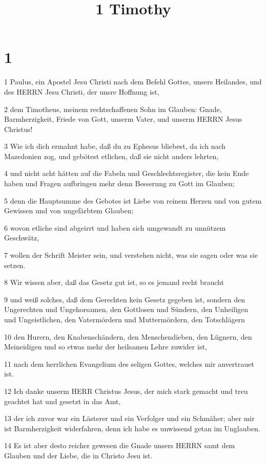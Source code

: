 

\title{1 Timothy}


\chapter{1}

\par 1 Paulus, ein Apostel Jesu Christi nach dem Befehl Gottes, unsers Heilandes, und des HERRN Jesu Christi, der unsre Hoffnung ist,
\par 2 dem Timotheus, meinem rechtschaffenen Sohn im Glauben: Gnade, Barmherzigkeit, Friede von Gott, unserm Vater, und unserm HERRN Jesus Christus!
\par 3 Wie ich dich ermahnt habe, daß du zu Ephesus bliebest, da ich nach Mazedonien zog, und gebötest etlichen, daß sie nicht anders lehrten,
\par 4 und nicht acht hätten auf die Fabeln und Geschlechtsregister, die kein Ende haben und Fragen aufbringen mehr denn Besserung zu Gott im Glauben;
\par 5 denn die Hauptsumme des Gebotes ist Liebe von reinem Herzen und von gutem Gewissen und von ungefärbtem Glauben;
\par 6 wovon etliche sind abgeirrt und haben sich umgewandt zu unnützem Geschwätz,
\par 7 wollen der Schrift Meister sein, und verstehen nicht, was sie sagen oder was sie setzen.
\par 8 Wir wissen aber, daß das Gesetz gut ist, so es jemand recht braucht
\par 9 und weiß solches, daß dem Gerechten kein Gesetz gegeben ist, sondern den Ungerechten und Ungehorsamen, den Gottlosen und Sündern, den Unheiligen und Ungeistlichen, den Vatermördern und Muttermördern, den Totschlägern
\par 10 den Hurern, den Knabenschändern, den Menschendieben, den Lügnern, den Meineidigen und so etwas mehr der heilsamen Lehre zuwider ist,
\par 11 nach dem herrlichen Evangelium des seligen Gottes, welches mir anvertrauet ist.
\par 12 Ich danke unserm HERR Christus Jesus, der mich stark gemacht und treu geachtet hat und gesetzt in das Amt,
\par 13 der ich zuvor war ein Lästerer und ein Verfolger und ein Schmäher; aber mir ist Barmherzigkeit widerfahren, denn ich habe es unwissend getan im Unglauben.
\par 14 Es ist aber desto reicher gewesen die Gnade unsers HERRN samt dem Glauben und der Liebe, die in Christo Jesu ist.
